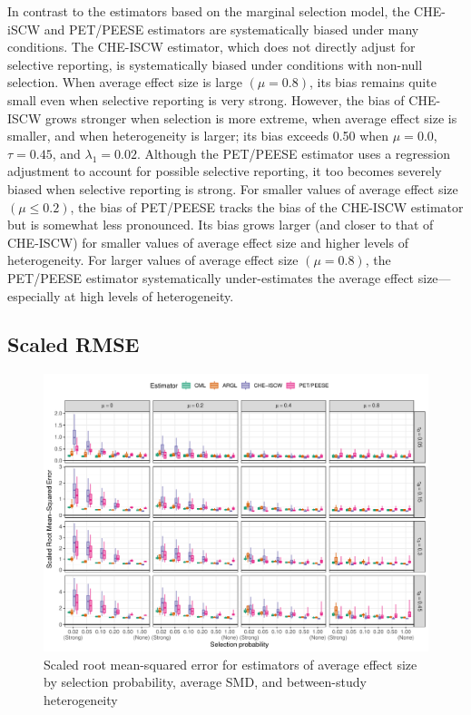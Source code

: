 \documentclass[
  american,
  man, donotrepeattitle,floatsintext]{apa7}
\begin{document}
In contrast to the estimators based on the marginal selection model, the CHE-iSCW and PET/PEESE estimators are systematically biased under many conditions.
The CHE-ISCW estimator, which does not directly adjust for selective reporting, is systematically biased under conditions with non-null selection.
When average effect size is large \((\mu = 0.8)\), its bias remains quite small even when selective reporting is very strong.
However, the bias of CHE-ISCW grows stronger when selection is more extreme, when average effect size is smaller, and when heterogeneity is larger; its bias exceeds 0.50 when \(\mu = 0.0\), \(\tau = 0.45\), and \(\lambda_1 = 0.02\).
Although the PET/PEESE estimator uses a regression adjustment to account for possible selective reporting, it too becomes severely biased when selective reporting is strong.
For smaller values of average effect size \((\mu \leq 0.2)\), the bias of PET/PEESE tracks the bias of the CHE-ISCW estimator but is somewhat less pronounced. Its bias grows larger (and closer to that of CHE-ISCW) for smaller values of average effect size and higher levels of heterogeneity.
For larger values of average effect size \((\mu = 0.8)\), the PET/PEESE estimator systematically under-estimates the average effect size---especially at high levels of heterogeneity.

\subsection{Scaled RMSE}\label{scaled-rmse}

\begin{figure}
\includegraphics{step-function-selection-models-with-dependent-effects_files/figure-latex/mu-rmse-1} \caption{Scaled root mean-squared error for estimators of average effect size by selection probability, average SMD, and between-study heterogeneity}\label{fig:mu-rmse}
\end{figure}
\end{document}
